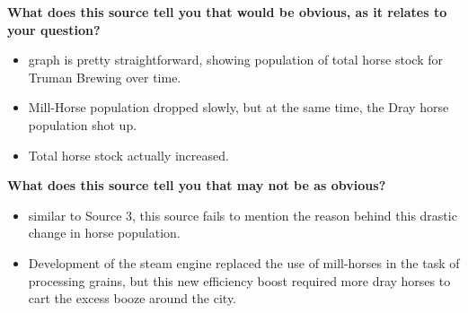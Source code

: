 

\textbf{What does this source tell you that would be obvious, as it relates to your question?}
\begin{itemize}
    \item graph is pretty straightforward, showing population of total horse stock for Truman Brewing over time.
    \item Mill-Horse population dropped slowly, but at the same time, the Dray horse population shot up.
    \item Total horse stock actually increased.
    \\
\end{itemize}

\textbf{What does this source tell you that may not be as obvious?}
\begin{itemize}
    \item similar to Source 3, this source fails to mention the reason behind this drastic change in horse population.
    \item Development of the steam engine replaced the use of mill-horses in the task of processing grains, but this new efficiency boost required more dray horses to cart the excess booze around the city.
\end{itemize}